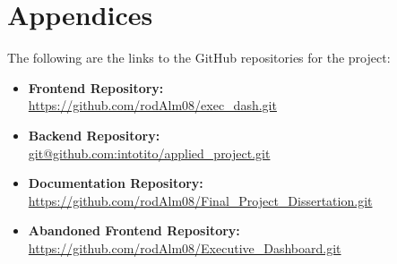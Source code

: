 \chapter{Appendices}

\label{appendix}



\label{sec:github-links}

The following are the links to the GitHub repositories for the project:

\begin{itemize}
    \item \textbf{Frontend Repository:} \\ \url{https://github.com/rodAlm08/exec_dash.git}
    \item \textbf{Backend Repository:} \\ \url{git@github.com:intotito/applied_project.git}
    \item \textbf{Documentation Repository:} \\ \url{https://github.com/rodAlm08/Final_Project_Dissertation.git}
    \item \textbf{Abandoned Frontend Repository:} \\ \url{https://github.com/rodAlm08/Executive_Dashboard.git}
\end{itemize}




\label{sec:ethics-application}





\label{sec:form-recruitment}

